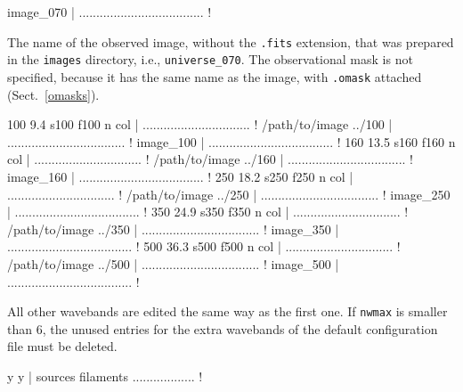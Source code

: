 \documentclass[a4paper,10pt]{article}
\begin{document}
\begin{verbnobox}[\mbox{}\small]
 image_070           | .................................... !
\end{verbnobox}
The name of the observed image, without the \verb!.fits! extension, that was prepared in the \verb!images! directory, i.e.,
\verb!universe_070!. The observational mask is not specified, because it has the same name as the image, with \verb!.omask!
attached (Sect.~\ref{omasks}).
\begin{verbnobox}[\mbox{}\small]
 100  9.4 s100 f100 n col | ............................... !
 /path/to/image ../100 | .................................. !
 image_100           | .................................... !
 160 13.5 s160 f160 n col | ............................... !
 /path/to/image ../160 | .................................. !
 image_160           | .................................... !
 250 18.2 s250 f250 n col | ............................... !
 /path/to/image ../250 | .................................. !
 image_250           | .................................... !
 350 24.9 s350 f350 n col | ............................... !
 /path/to/image ../350 | .................................. !
 image_350           | .................................... !
 500 36.3 s500 f500 n col | ............................... !
 /path/to/image ../500 | .................................. !
 image_500           | .................................... !
\end{verbnobox}
All other wavebands are edited the same way as the first one. If \verb!nwmax! is smaller than 6, the unused entries for the extra
wavebands of the default configuration file must be deleted.
\begin{verbnobox}[\mbox{}\small]
 y y                 | sources filaments .................. !
\end{verbnobox}
\end{document}
